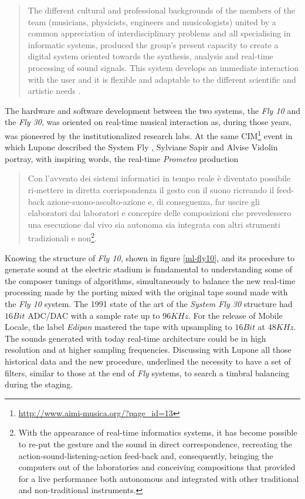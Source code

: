 \documentclass[twoside,a4paper]{article}
\begin{document}

\begin{quote}
The different cultural and professional backgrounds of the members of the team
(musicians, physicists, engineers and musicologists) united by a common
appreciation of interdisciplinary problems and all specialising in informatic
systems, produced the group's present capacity to create a digital system
oriented towards the synthesis, analysis and real-time processing of sound
signals. This system develops an immediate interaction with the user and it is
flexible and adaptable to the different scientific and artistic needs \cite{ml91}.
\end{quote}

The hardware and software development between the two systems, the \emph{Fly 10}
and the \emph{Fly 30}, was oriented on real-time musical interaction as, during
those years, was pioneered by the institutionalized research labs. At the same
CIM\footnote{\url{http://www.aimi-musica.org/?page_id=13}} event in which Lupone
described the System Fly \cite{ml85},  Sylviane Sapir and Alvise Vidolin
\cite{savi85} portray, with inspiring words, the real-time \emph{Prometeo}
production

\begin{quote}
Con l'avvento dei sistemi informatici in tempo reale è diventato possibile
ri-mettere in diretta corrispondenza il gesto con il suono ricreando il feed-back
azione-suono-ascolto-azione e, di conseguenza, far uscire gli elaboratori dai
laboratori e concepire delle composizioni che prevedessero una esecuzione dal
vivo sia autonoma sia integrata con altri strumenti tradizionali e
non\footnote{With the appearance of real-time informatics systems, it has become
possible to re-put the gesture and the sound in direct correspondence, recreating
the action-sound-listening-action feed-back and, consequently, bringing the
computers out of the laboratories and conceiving compositions that provided for a
live performance both autonomous and integrated with other traditional and
non-traditional instruments.}.
\end{quote}

Knowing the structure of \emph{Fly 10}, shown in figure \ref{ml-fly10}, and its
procedure to generate sound at the electric stadium is fundamental to understanding
some of the composer tunings of algorithms,  simultaneously to balance the new
real-time processing made by the porting mixed with the original tape sound made
with the \emph{Fly 10} system. The 1991 state of the art of the \emph{System Fly
30} structure had $16Bit$ ADC/DAC with a sample rate up to $96KHz$. For the
release of Mobile Locale, the label \emph{Edipan} mastered the tape with upsampling
to $16Bit$ at $48KHz$. The sounds generated with today real-time architecture
could be in high resolution and at higher sampling frequencies. Discussing with
Lupone all those historical data and the new procedure, underlined the necessity
to have a set of filters, similar to those at the end of \emph{Fly} systems, to
search a timbral balancing during the staging.
\end{document}

